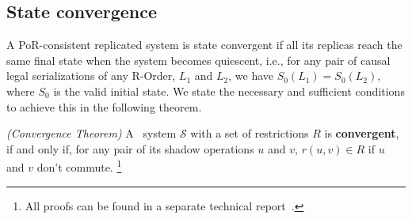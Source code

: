 \subsection{State convergence}
\label{sec:properties:converge}
A PoR-consistent replicated system is state convergent if all its replicas reach
the same final state when the system becomes quiescent, i.e., for any pair of causal legal serializations
of any R-Order, $L_{1}$ and $L_{2}$, we have $S_0(L_1) = S_0(L_2)$, where $S_0$ is the valid initial state. We
state the necessary and sufficient conditions to achieve this in the following theorem.



\begin{theorem}
\label{theorem:convergence}
\emph{(Convergence Theorem)}
A \PRCAJ\ system $\mathscr{S}$ with a set of restrictions $R$ is \textbf{convergent}, if and only if,
for any pair of its shadow operations $u$ and $v$, $r(u, v) \in R$ if $u$ and $v$ don't commute.
\footnote{All proofs can be found in a separate technical report~\cite{}.}
\end{theorem}


